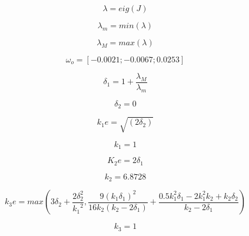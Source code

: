 \documentclass[12pt]{article}
\begin{document}
\begin{itemize}

    \begin{equation*}
        \lambda = eig(J)
    \end{equation*}
    
    \begin{equation*}
        \lambda_m = min(\lambda)
    \end{equation*}
    
    \begin{equation*}
        \lambda_M = max(\lambda)
    \end{equation*}
    
    \begin{equation*}
        \omega_o = [-0.0021; -0.0067; 0.0253]
    \end{equation*}
    
    \begin{equation*}
        \delta_1 = 1 + \frac{\lambda_M}{\lambda_m}
    \end{equation*}
    
    \begin{equation*}
        \delta_2 = 0
    \end{equation*}
    
    \begin{equation*}
        k_1e = \sqrt{(2\delta_2)}
    \end{equation*}
    
    \begin{equation*}
        k_1 = 1
    \end{equation*}
    
    \begin{equation*}
        K_2e = 2\delta_1
    \end{equation*}
    
    \begin{equation*}
        k_2 = 6.8728
    \end{equation*}
    
    \begin{equation*}
        k_3e = max\left(3\delta_2 + \frac{2\delta_2^2}{{k_1}^2}, \frac{9(k_1 \delta_1)^2}{16k_2(k_2 - 2\delta_1)} + \frac{0.5 k_1^2\delta_1 -2k_1^2k_2+ k_2\delta_2}{k_2 - 2\delta_1}\right)
    \end{equation*}
    
    \begin{equation*}
        k_3 = 1
    \end{equation*}
    

\end{itemize}
\end{document}
